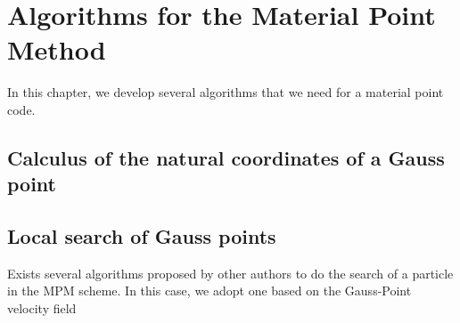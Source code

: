 
\section{Algorithms for the Material Point Method}
\label{sec:algor-mater-point}

In this chapter, we develop several algorithms that we need for a
material point code.

\subsection{Calculus of the natural coordinates of a Gauss point}
\label{sec:calc-natur-coord}


\subsection{Local search of Gauss points}
\label{sec:local-search-gauss}

Exists several algorithms proposed by other authors to do the search
of a particle in the MPM scheme. In this case, we adopt one based on
the Gauss-Point velocity field


